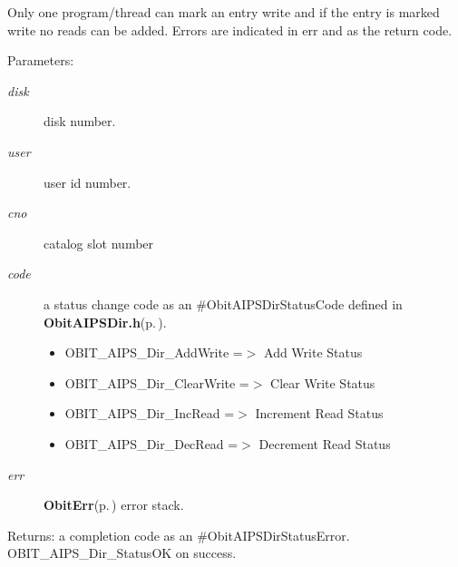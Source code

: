 Only one program/thread can mark an entry write and if the entry is marked write no reads can be added. Errors are indicated in err and as the return code. \begin{Desc}
\item[Parameters:]
\begin{description}
\item[{\em disk}]disk number. \item[{\em user}]user id number. \item[{\em cno}]catalog slot number \item[{\em code}]a status change code as an \#Obit\-AIPSDir\-Status\-Code defined in {\bf Obit\-AIPSDir.h}{\rm (p.\,\pageref{ObitAIPSDir_8h})}. \begin{itemize}
\item OBIT\_\-AIPS\_\-Dir\_\-Add\-Write =$>$ Add Write Status \item OBIT\_\-AIPS\_\-Dir\_\-Clear\-Write =$>$ Clear Write Status \item OBIT\_\-AIPS\_\-Dir\_\-Inc\-Read =$>$ Increment Read Status \item OBIT\_\-AIPS\_\-Dir\_\-Dec\-Read =$>$ Decrement Read Status \end{itemize}
\item[{\em err}]{\bf Obit\-Err}{\rm (p.\,\pageref{structObitErr})} error stack. \end{description}
\end{Desc}
\begin{Desc}
\item[Returns:]a completion code as an \#Obit\-AIPSDir\-Status\-Error. OBIT\_\-AIPS\_\-Dir\_\-Status\-OK on success. \end{Desc}
